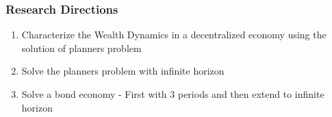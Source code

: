 \documentclass{beamer}
\theoremstyle{Definition}
\begin{document}
\begin{frame}
\frametitle{Research Directions}
\begin{enumerate}
\item Characterize the Wealth Dynamics in a decentralized economy using the solution of planners problem 
	\item Solve the planners problem with infinite horizon 
	\item Solve a bond economy - First with 3 periods and then extend to infinite horizon
	\end{enumerate}
\end{frame}  
\end{document}
